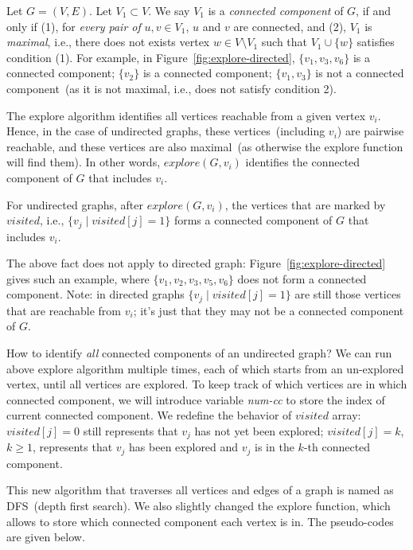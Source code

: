 Let $G = (V, E)$. Let $V_1\subset V$. We say $V_1$ is a \emph{connected component} of $G$,
if and only if (1), for \emph{every pair of} $u,v\in V_1$, $u$ and $v$ are connected,
and (2), $V_1$ is \emph{maximal}, i.e., there does not exists vertex $w\in V\setminus V_1$ such
that $V_1\cup \{w\}$ satisfies condition (1).
For example, in Figure~\ref{fig:explore-directed}, $\{v_1, v_3, v_6\}$ is a connected component;
$\{v_2\}$ is a connected component; 
$\{v_1, v_3\}$ is not a connected component~(as it is not maximal, i.e., does not satisfy condition 2). 

The explore algorithm identifies all vertices reachable from a given vertex $v_i$.
Hence, in the case of undirected graphs, these vertices~(including $v_i$) are pairwise reachable, 
and these vertices are also maximal~(as otherwise the explore function will find them).
In other words, $explore(G,v_i)$ identifies the connected component of $G$ that includes $v_i$.

\begin{fact}
For undirected graphs, after $explore(G, v_i)$, the vertices that are marked by $visited$, i.e.,
$\{v_j \mid visited[j] = 1\}$ forms a connected component of $G$ that includes $v_i$.
\end{fact}

The above fact does not apply to directed graph: Figure~\ref{fig:explore-directed} gives such an example,
where $\{v_1,v_2,v_3,v_5,v_6\}$ does not form a connected component. Note: in directed graphs
$\{v_j \mid visited[j] = 1\}$ are still those vertices that are reachable from $v_i$; it's just that
they may not be a connected component of $G$.

How to identify \emph{all} connected components of an undirected graph?
We can run above explore algorithm multiple times, each of which starts from an un-explored vertex,
until all vertices are explored. To keep track of which vertices are in which connected
component, we will introduce variable \emph{num-cc} to store the index of current connected component.
We redefine the behavior of $visited$ array: $visited[j] = 0$ still represents that $v_j$ has not yet been explored;
$visited[j] = k$, $k\ge 1$, represents that $v_j$ has been explored and $v_j$ is in the $k$-th connected component.

This new algorithm that traverses all vertices and edges of a graph is named as DFS~(depth first search).
We also slightly changed the explore function, which allows to store which connected component each vertex is in.
The pseudo-codes are given below.

